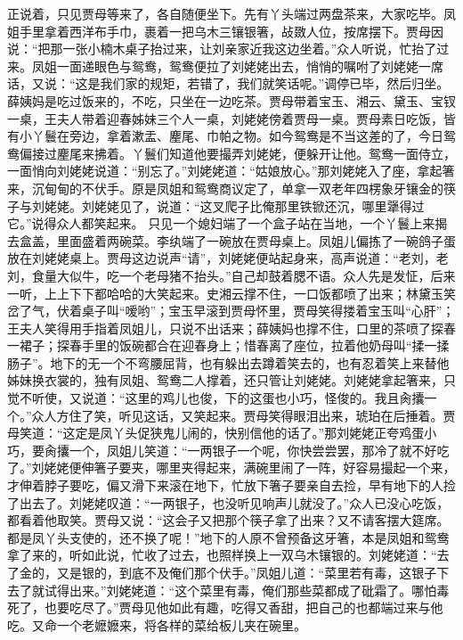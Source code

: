 \documentclass[12pt,oneside]{book}
\begin{document}
正说着，只见贾母等来了，各自随便坐下。先有丫头端过两盘茶来，大家吃毕。凤姐手里拿着西洋布手巾，裹着一把乌木三镶银箸，敁敪人位，按席摆下。贾母因说：“把那一张小楠木桌子抬过来，让刘亲家近我这边坐着。”众人听说，忙抬了过来。凤姐一面递眼色与鸳鸯，鸳鸯便拉了刘姥姥出去，悄悄的嘱咐了刘姥姥一席话，又说：“这是我们家的规矩，若错了，我们就笑话呢。”调停已毕，然后归坐。薛姨妈是吃过饭来的，不吃，只坐在一边吃茶。贾母带着宝玉、湘云、黛玉、宝钗一桌，王夫人带着迎春姊妹三个人一桌，刘姥姥傍着贾母一桌。贾母素日吃饭，皆有小丫鬟在旁边，拿着漱盂、麈尾、巾帕之物。如今鸳鸯是不当这差的了，今日鸳鸯偏接过麈尾来拂着。丫鬟们知道他要撮弄刘姥姥，便躲开让他。鸳鸯一面侍立，一面悄向刘姥姥说道：“别忘了。”刘姥姥道：“姑娘放心。”那刘姥姥入了座，拿起箸来，沉甸甸的不伏手。原是凤姐和鸳鸯商议定了，单拿一双老年四楞象牙镶金的筷子与刘姥姥。刘姥姥见了，说道：“这叉爬子比俺那里铁锨还沉，哪里犟得过它。”说得众人都笑起来。
只见一个媳妇端了一个盒子站在当地，一个丫鬟上来揭去盒盖，里面盛着两碗菜。李纨端了一碗放在贾母桌上。凤姐儿偏拣了一碗鸽子蛋放在刘姥姥桌上。贾母这边说声“请”，刘姥姥便站起身来，高声说道：“老刘，老刘，食量大似牛，吃一个老母猪不抬头。”自己却鼓着腮不语。众人先是发怔，后来一听，上上下下都哈哈的大笑起来。史湘云撑不住，一口饭都喷了出来；林黛玉笑岔了气，伏着桌子叫“嗳哟”；宝玉早滚到贾母怀里，贾母笑得搂着宝玉叫“心肝”；王夫人笑得用手指着凤姐儿，只说不出话来；薛姨妈也撑不住，口里的茶喷了探春一裙子；探春手里的饭碗都合在迎春身上；惜春离了座位，拉着他奶母叫“揉一揉肠子”。地下的无一个不弯腰屈背，也有躲出去蹲着笑去的，也有忍着笑上来替他姊妹换衣裳的，独有凤姐、鸳鸯二人撑着，还只管让刘姥姥。刘姥姥拿起箸来，只觉不听使，又说道：“这里的鸡儿也俊，下的这蛋也小巧，怪俊的。我且肏攮一个。”众人方住了笑，听见这话，又笑起来。贾母笑得眼泪出来，琥珀在后捶着。贾母笑道：“这定是凤丫头促狭鬼儿闹的，快别信他的话了。”那刘姥姥正夸鸡蛋小巧，要肏攮一个，凤姐儿笑道：“一两银子一个呢，你快尝尝罢，那冷了就不好吃了。”刘姥姥便伸箸子要夹，哪里夹得起来，满碗里闹了一阵，好容易撮起一个来，才伸着脖子要吃，偏又滑下来滚在地下，忙放下箸子要亲自去捡，早有地下的人捡了出去了。刘姥姥叹道：“一两银子，也没听见响声儿就没了。”众人已没心吃饭，都看着他取笑。贾母又说：“这会子又把那个筷子拿了出来？又不请客摆大筵席。都是凤丫头支使的，还不换了呢！”地下的人原不曾预备这牙箸，本是凤姐和鸳鸯拿了来的，听如此说，忙收了过去，也照样换上一双乌木镶银的。刘姥姥道：“去了金的，又是银的，到底不及俺们那个伏手。”凤姐儿道：“菜里若有毒，这银子下去了就试得出来。”刘姥姥道：“这个菜里有毒，俺们那些菜都成了砒霜了。哪怕毒死了，也要吃尽了。”贾母见他如此有趣，吃得又香甜，把自己的也都端过来与他吃。又命一个老嬷嬷来，将各样的菜给板儿夹在碗里。
\end{document}
